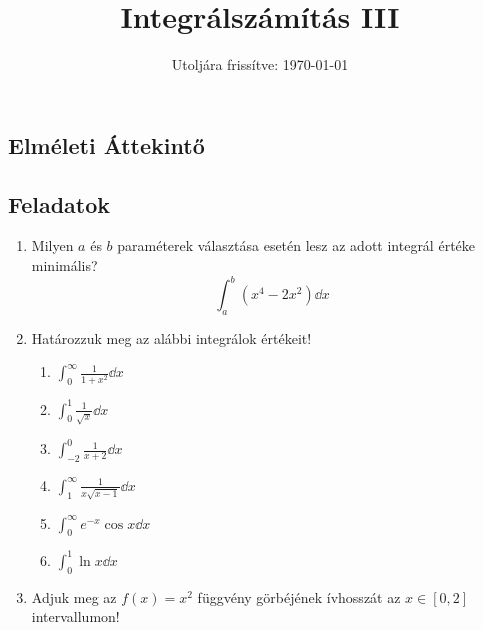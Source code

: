 \documentclass[a4paper, 12pt]{scrartcl}
\title{Integrálszámítás III}
\date{Utoljára frissítve: \today}
\begin{document}
\maketitle

\subsection{Elméleti Áttekintő}

\clearpage
\subsection{Feladatok}

\begin{enumerate}
  \item Milyen $a$ és $b$ paraméterek választása esetén lesz az adott integrál
        értéke minimális?
        \[
          \int_a^b (x^4 - 2x^2) \dd x
        \]

  \item Határozzuk meg az alábbi integrálok értékeit!
        \begin{multicols}{3}
          \begin{enumerate}
            \item $\displaystyle
                    \int_0^\infty \frac{1}{1 + x^2} \dd x
                  $

            \item $\displaystyle
                    \int_0^1 \frac{1}{\sqrt{x}} \dd x
                  $

            \item $\displaystyle
                    \int_{-2}^0 \frac{1}{x + 2} \dd x
                  $

            \item $\displaystyle
                    \int_1^\infty \frac{1}{x \sqrt{x - 1}} \dd x
                  $

            \item $\displaystyle
                    \int_0^\infty e^{-x} \cos x \dd x
                  $

            \item $\displaystyle
                    \int_0^1 \ln x \dd x
                  $
          \end{enumerate}
        \end{multicols}

  \item Adjuk meg az $f(x) = x^2$ függvény görbéjének ívhosszát az $x \in [0, 2]$
        intervallumon!


\end{enumerate}
\end{document}
